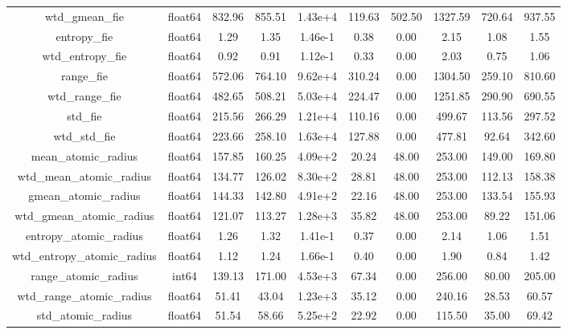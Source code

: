 \documentclass[11pt]{article}
\begin{document}
\begin{table}
{\begin{tabular}{|c|c|c|c|c|c|c|c|c|c|}
wtd\_gmean\_fie                    & float64&   832.96&   855.51&  1.43e+4&   119.63&  502.50&   1327.59&   720.64&   937.55 \\
entropy\_fie                      & float64&     1.29&     1.35&  1.46e-1&     0.38&    0.00&      2.15&     1.08&     1.55 \\
wtd\_entropy\_fie                  & float64&     0.92&     0.91&  1.12e-1&     0.33&    0.00&      2.03&     0.75&     1.06 \\
range\_fie                        & float64&   572.06&   764.10&  9.62e+4&   310.24&    0.00&   1304.50&   259.10&   810.60 \\
wtd\_range\_fie                    & float64&   482.65&   508.21&  5.03e+4&   224.47&    0.00&   1251.85&   290.90&   690.55 \\
std\_fie                          & float64&   215.56&   266.29&  1.21e+4&   110.16&    0.00&    499.67&   113.56&   297.52 \\
wtd\_std\_fie                      & float64&   223.66&   258.10&  1.63e+4&   127.88&    0.00&    477.81&    92.64&   342.60 \\
mean\_atomic\_radius               & float64&   157.85&   160.25&  4.09e+2&    20.24&   48.00&    253.00&   149.00&   169.80 \\
wtd\_mean\_atomic\_radius           & float64&   134.77&   126.02&  8.30e+2&    28.81&   48.00&    253.00&   112.13&   158.38 \\
gmean\_atomic\_radius              & float64&   144.33&   142.80&  4.91e+2&    22.16&   48.00&    253.00&   133.54&   155.93 \\
wtd\_gmean\_atomic\_radius          & float64&   121.07&   113.27&  1.28e+3&    35.82&   48.00&    253.00&    89.22&   151.06 \\
entropy\_atomic\_radius            & float64&     1.26&     1.32&  1.41e-1&     0.37&    0.00&      2.14&     1.06&     1.51 \\
wtd\_entropy\_atomic\_radius        & float64&     1.12&     1.24&  1.66e-1&     0.40&    0.00&      1.90&     0.84&     1.42 \\
range\_atomic\_radius              &   int64&   139.13&   171.00&  4.53e+3&    67.34&    0.00&    256.00&    80.00&   205.00 \\
wtd\_range\_atomic\_radius          & float64&    51.41&    43.04&  1.23e+3&    35.12&    0.00&    240.16&    28.53&    60.57 \\
std\_atomic\_radius                & float64&    51.54&    58.66&  5.25e+2&    22.92&    0.00&    115.50&    35.00&    69.42 \\

\end{tabular}}
\end{table}
\end{document}
